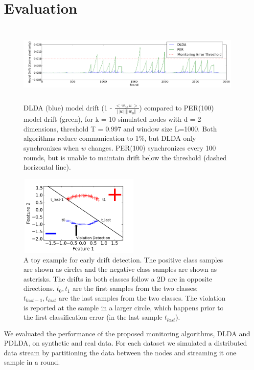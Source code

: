 \section{Evaluation}
\begin{figure}[ht]
	\centering
	\includegraphics[width=\textwidth, height=4cm]{PER/PERvsDLDAoverTime.png}
	\caption{ DLDA (blue) model drift (1 - $\frac{<w_0,w>}{||w||||w_0||}$) compared to PER(100) model drift (green),
	for k = 10 simulated nodes with d = 2 dimensions, threshold T = 0.997 and
	window size L=1000. Both algorithms reduce communication to 1\%, but DLDA
	only synchronizes when $w$ changes. PER(100) synchronizes every 100 rounds,
	but is unable to maintain drift below the threshold (dashed horizontal line).}
	\label{PERvsDLDAoverTime}
\end{figure}
\begin{figure}[ht]
	\centering
	\includegraphics[width=60mm,height=4cm]{EarlyDetection.png}
	\caption{A toy example for early drift detection. The positive class samples are shown as circles and the negative class samples are shown as asterisks. The drifts in both classes follow a 2D arc in opposite directions. $t_0, t_1$ are the first samples from the two classes; $t_{last-1}, t_{last}$ are the last samples from the two classes. The violation is reported at the sample in a larger circle, which happens prior to the first classification error (in the  last sample $t_{last}$).}
	\label{EarlyDetection}
\end{figure}
We evaluated the performance of the proposed monitoring algorithms,
DLDA and PDLDA, on synthetic and real
data. For each dataset we simulated a distributed data stream by partitioning the data between the nodes and streaming it one sample in a round. 

